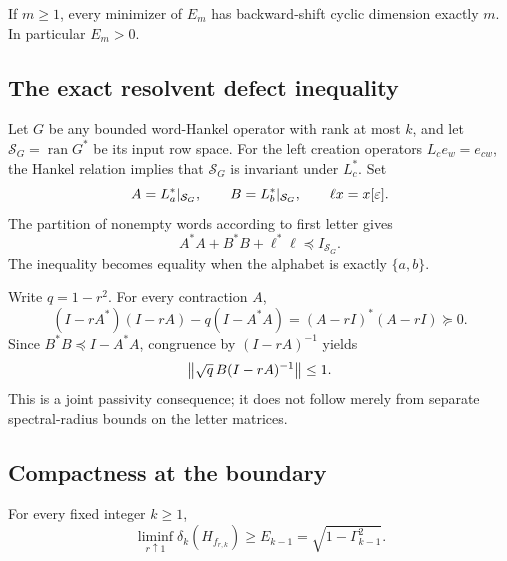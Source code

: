 

\begin{lemma}
\label{I:B:lem:exact-rank-minimizer}
If $m\ge1$, every minimizer of $E_m$ has backward-shift cyclic dimension
exactly $m$. In particular $E_m>0$.
\end{lemma}



\subsection{The exact resolvent defect inequality}

Let $G$ be any bounded word-Hankel operator with rank at most $k$, and
let $\mathcal S_G=\operatorname{ran}G^*$ be its input row space.
For the left creation operators $L_c e_w=e_{cw}$, the Hankel relation
implies that $\mathcal S_G$ is invariant under $L_c^*$. Set
\[
 A=L_a^*|_{\mathcal S_G},\qquad
 B=L_b^*|_{\mathcal S_G},\qquad
 \ell x=x[\varepsilon].
\]
The partition of nonempty words according to first letter gives
\begin{equation}
 A^*A+B^*B+\ell^*\ell\preceq I_{\mathcal S_G}.
 \label{I:B:eq:boundary-passivity}
\end{equation}
The inequality becomes equality when the alphabet is exactly $\{a,b\}$.

Write $q=1-r^2$. For every contraction $A$,
\begin{equation}
 (I-rA^*)(I-rA)-q(I-A^*A)
       =(A-rI)^*(A-rI)\succeq0.
 \label{I:B:eq:resolvent-defect-exact}
\end{equation}
Since $B^*B\preceq I-A^*A$, congruence by $(I-rA)^{-1}$ yields
\begin{equation}
 \left\lVert\sqrt q\,B(I-rA)^{-1}\right\rVert\le1.
 \label{I:B:eq:resolvent-defect-contraction}
\end{equation}
This is a joint passivity consequence; it does not follow merely from
separate spectral-radius bounds on the letter matrices.

\subsection{Compactness at the boundary}

\begin{theorem}
\label{I:B:thm:all-k-boundary-lower}
For every fixed integer $k\ge1$,
\begin{equation}
 \liminf_{r\uparrow1}\delta_k(H_{f_{r,k}})
          \ge E_{k-1}=\sqrt{1-\Gamma_{k-1}^2}.
 \label{I:B:eq:all-k-boundary-lower}
\end{equation}
\end{theorem}

